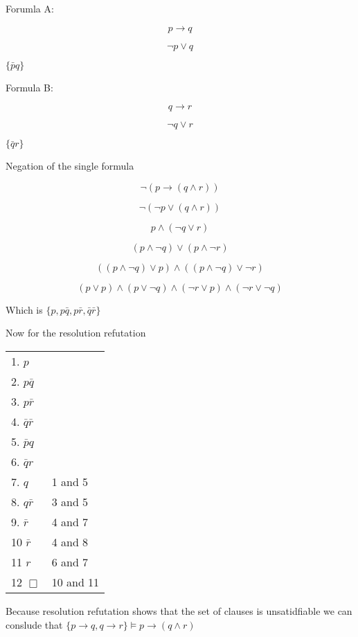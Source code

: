 \documentclass[10pt,a4paper]{article}
\begin{document}
Forumla A:

\begin{equation}
 p\rightarrow q
\end{equation}

\begin{equation}
 \neg p\vee q
\end{equation}

$\{\bar{p}q\}$

Formula B:

\begin{equation}
 q \rightarrow r
\end{equation}

\begin{equation}
 \neg q \vee r
\end{equation}


$\{\bar{q}r\}$


Negation of the single formula

\begin{equation}
 \neg(p\rightarrow (q\wedge r))
\end{equation}

\begin{equation}
 \neg(\neg p \vee (q \wedge r))
\end{equation}

\begin{equation}
 p \wedge (\neg q\vee r)
\end{equation}

\begin{equation}
 (p\wedge \neg q)\vee (p\wedge \neg r)
\end{equation}

\begin{equation}
 ((p\wedge \neg q) \vee p)\wedge((p\wedge\neg q)\vee \neg r)
\end{equation}

\begin{equation}
 (p\vee p)\wedge (p\vee \neg q)\wedge(\neg r \vee p)\wedge (\neg r \vee \neg q)
\end{equation}

Which is $\{p,p\bar{q},p\bar{r},\bar{q}\bar{r} \}$

Now for the resolution refutation


\begin{tabular}{ll}
1. $p$  &\\
2. $p\bar{q}$   &\\
3. $p\bar{r}$ &\\
4. $\bar{q}\bar{r}$  &\\
5. $\bar{p}q$   &           \\
6. $\bar{q}r$   &           \\
7. $q$  &           1 and 5\\
8. $q\bar{r}$   &           3 and 5\\
9. $\bar{r}$  &           4 and 7\\
10 $\bar{r}$   &           4 and 8\\
11 $r$   &           6 and 7\\
12 $\Box$   &           10 and 11\\
\end{tabular}

Because resolution refutation shows that the set of clauses is unsatidfiable we can conslude that 
$\{p\rightarrow q,q \rightarrow r\} \models p \rightarrow (q \wedge r)$
\end{document}
